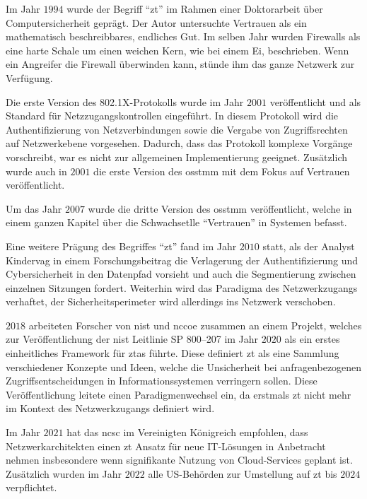 Im Jahr $1994$ wurde der Begriff \enquote{\ac{zt}} im Rahmen einer Doktorarbeit über Computersicherheit geprägt.
Der Autor untersuchte Vertrauen als ein mathematisch beschreibbares, endliches Gut.\autocite[\vglf][]{marsh-1994}
Im selben Jahr wurden Firewalls als eine harte Schale um einen weichen Kern, wie bei einem Ei, beschrieben.
Wenn ein Angreifer die Firewall überwinden kann, stünde ihm das ganze Netzwerk zur Verfügung. \autocite[\vglf][]{world-1994}

Die erste Version des 802.1X-Protokolls\autocite[\vglf][]{IEEE-2001} wurde im Jahr $2001$ veröffentlicht und als Standard für Netzzugangskontrollen eingeführt.
In diesem Protokoll wird die Authentifizierung von Netzverbindungen sowie die Vergabe von Zugriffsrechten auf Netzwerkebene vorgesehen.
Dadurch, dass das Protokoll komplexe Vorgänge vorschreibt, war es nicht zur allgemeinen Implementierung geeignet.\autocite[\vglf][]{zscaler-2022b}
Zusätzlich wurde auch in $2001$ die erste Version des \ac{osstmm} mit dem Fokus auf Vertrauen veröffentlicht.\autocite[\vglf][]{osstmm-2001}

Um das Jahr $2007$ wurde die dritte Version des \ac{osstmm} veröffentlicht, welche in einem ganzen Kapitel über die Schwachsetlle \enquote{Vertrauen} in Systemen befasst.\autocite[\vglf][]{osstmm-2010}

Eine weitere Prägung des Begriffes \enquote{\ac{zt}} fand im Jahr $2010$ statt, als der Analyst Kindervag in einem Forschungsbeitrag die Verlagerung der Authentifizierung und Cybersicherheit in den Datenpfad vorsieht und auch die Segmentierung zwischen einzelnen Sitzungen fordert.
Weiterhin wird das Paradigma des Netzwerkzugangs verhaftet, der Sicherheitsperimeter wird allerdings ins Netzwerk verschoben.\autocites[\vglf][]{zscaler-2022b}[\vglf][]{kindervag-2010}

$2018$ arbeiteten Forscher von \ac{nist} und \ac{nccoe} zusammen an einem Projekt, welches zur Veröffentlichung der \ac{nist} Leitlinie SP 800--207\autocite{NIST:800207} im Jahr $2020$ als ein erstes einheitliches Framework für \acp{zta} führte.
Diese definiert \ac{zt} als eine Sammlung verschiedener Konzepte und Ideen, welche die Unsicherheit bei anfragenbezogenen Zugriffsentscheidungen in Informationssystemen verringern sollen.
Diese Veröffentlichung leitete einen Paradigmenwechsel ein, da erstmals \ac{zt} nicht mehr im Kontext des Netzwerkzugangs definiert wird.\autocite[\vglf][]{zscaler-2022b}

Im Jahr $2021$ hat das \ac{ncsc} im Vereinigten Königreich empfohlen, dass Netzwerkarchitekten einen \ac{zt} Ansatz für neue IT-Lösungen in Anbetracht nehmen insbesondere wenn signifikante Nutzung von Cloud-Services geplant ist.\autocite{ncsc-2021}
Zusätzlich wurden im Jahr $2022$ alle US-Behörden zur Umstellung auf \ac{zt} bis $2024$ verpflichtet.\autocite[\vglf][]{zscaler-2022b}


